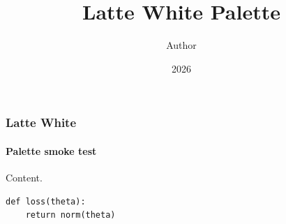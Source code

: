 \documentclass[notheorems,aspectratio=169]{beamer}
\title{Latte White Palette}
\author{Author}
\date{2026}
\begin{document}
\maketitle

\begin{frame}[fragile]
  \frametitle{Latte White}
  \framesubtitle{Palette smoke test}

  Content.

  \begin{verbatim}
def loss(theta):
    return norm(theta)
  \end{verbatim}
\end{frame}
\end{document}
